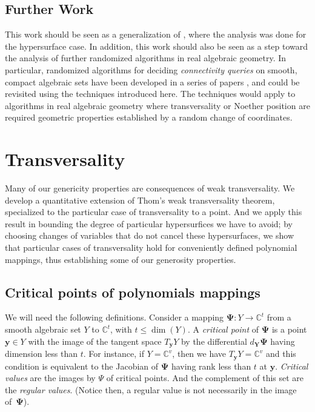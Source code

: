 \documentclass[a4paper]{article}
\def\C{\mathbb{C}}
\begin{document}
\subsection{Further Work}
This work should be seen as a generalization of \cite{ElGiSh20}, where the analysis was done for the hypersurface case. In addition, this work should also be seen as a step toward the analysis of
further randomized algorithms in real algebraic geometry.  In particular, randomized algorithms for deciding {\em
  connectivity queries} on smooth, compact algebraic sets have been
developed in a series of papers
\cite{SchostMohabBabySteps2011,SchostMohabBabySteps2014}, and could be
revisited using the techniques introduced here. The techniques would apply to algorithms in real algebraic geometry where transversality or Noether position are required geometric properties established by a random change of coordinates.



\section{Transversality}
Many of our genericity properties are consequences of weak transversality. We develop a quantitative extension of Thom’s weak transversality theorem, specialized to the particular case of transversality to a point. And we apply this result in bounding the degree of particular hypersurfices we have to avoid; by choosing changes of variables that do not cancel these hypersurfaces, we show that particular cases of transversality hold for conveniently defined polynomial mappings, thus establishing some of our generosity properties.  



\subsection{Critical points of polynomials mappings}
We will need the following definitions. Consider a mapping $\bm \Psi : Y \rightarrow \C^t$ 
from a smooth algebraic set $Y$ to $\C^t$, with $t\le \dim(Y)$. A {\em
  critical point} of $\bm \Psi$ is a point $\bm y \in Y$ with the
image of the tangent space $T_{\bm y} Y$ by the differential $d_{\bm
  Y} \bm \Psi$ having dimension less than $t$. For instance, if
$Y=\C^v$, then we have $T_{\bm y} Y=\C^v$ and this condition is equivalent
to the Jacobian of $\bm \Psi$ having rank less than $t$ at $\bm y$.
{\em Critical values} are the images by $\Psi$ of critical points. And the
complement of this set are the {\em regular values}. (Notice then, a regular
value is not necessarily in the image of~$\bm\Psi$).
\end{document}
